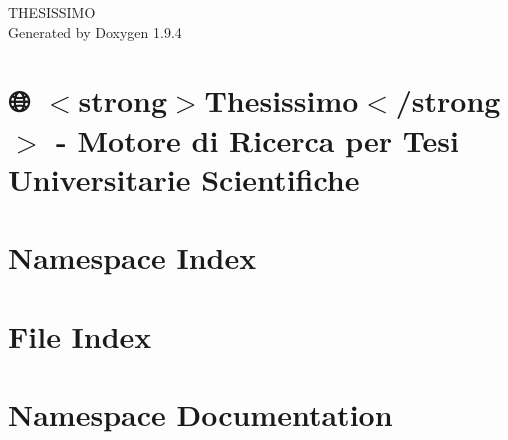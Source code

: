 \documentclass[twoside]{book}
\newcommand{\+}{\discretionary{\mbox{\scriptsize$\hookleftarrow$}}{}{}}
\newcommand{\clearemptydoublepage}{%
    \newpage{\pagestyle{empty}\cleardoublepage}%
  }
\begin{document}
  \raggedbottom
    \hypersetup{pageanchor=false,
                bookmarksnumbered=true,
                pdfencoding=unicode
               }
  \begin{titlepage}
  \vspace*{7cm}
  \begin{center}%
  {\Large THESISSIMO}\\
  \vspace*{1cm}
  {\large Generated by Doxygen 1.9.4}\\
  \end{center}
  \end{titlepage}
  \clearemptydoublepage
  \tableofcontents
  \clearemptydoublepage
  \hypersetup{pageanchor=true}
\chapter{🌐 \texorpdfstring{$<$}{<}strong\texorpdfstring{$>$}{>}Thesissimo\texorpdfstring{$<$}{<}/strong\texorpdfstring{$>$}{>} -\/ Motore di Ricerca per Tesi Universitarie Scientifiche}
\label{index}\hypertarget{index}{}
\chapter{Namespace Index}

\chapter{File Index}

\chapter{Namespace Documentation}





















\end{document}
